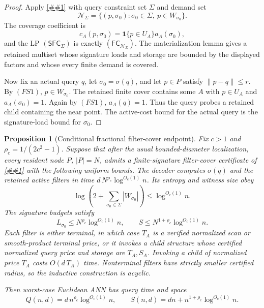 \documentclass[10pt]{article}
\newcommand{\cref}[1]{\ref{##1}}
\newtheorem{proposition}[theorem]{Proposition}
\theoremstyle{definition}
\begin{document}
\begin{proof}
   Apply \cref{lem:poisson-filter-cover-materialization} with query constraint
   set \(\Sigma\) and demand set
   \[
      \mathcal N_\Sigma
      =
      \{(p,\sigma_0):\sigma_0\in\Sigma,\ p\in W_{\sigma_0}\}.
   \]
   The coverage coefficient is
   \[
      c_A(p,\sigma_0)=\mathbf 1\{p\in U_A\}a_A(\sigma_0),
   \]
   and the LP \((\mathsf{SFC}_\Sigma)\) is exactly
   \((\mathsf{FC}_{\mathcal N_\Sigma})\).  The materialization lemma gives a
   retained multiset whose signature loads and storage are bounded by the
   displayed factors and whose every finite demand is covered.

   Now fix an actual query \(q\), let \(\sigma_0=\sigma(q)\), and let
   \(p\in P\) satisfy \(\|p-q\|\le r\).  By \((FS1)\), \(p\in W_{\sigma_0}\).
   The retained finite cover contains some \(A\) with \(p\in U_A\) and
   \(a_A(\sigma_0)=1\).  Again by \((FS1)\), \(a_A(q)=1\).  Thus the query probes
   a retained child containing the near point.  The active-cost bound for the
   actual query is the signature-load bound for \(\sigma_0\).
\end{proof}

\begin{proposition}[Conditional fractional filter-cover endpoint]
   \label{prop:fractional-filter-cover-polylog}
   Fix \(c>1\) and \(\rho_c=1/(2c^2-1)\).  Suppose that after the usual
   bounded-diameter localization, every resident node \(P\), \(|P|=N\), admits a
   finite-signature filter-cover certificate of
   \cref{lem:finite-signature-filter-cover} with the following uniform bounds.
   The decoder computes \(\sigma(q)\) and the retained active filters in time
   \(d\,N^{\rho_c}\log^{O_c(1)}n\).  Its entropy and witness size obey
   \[
      \log\left(2+\sum_{\sigma_0\in\Sigma}|W_{\sigma_0}|\right)
      \le \log^{O_c(1)}n.
      \tag{FE1}
   \]
   The signature budgets satisfy
   \[
      L_{\sigma_0}\le N^{\rho_c}\log^{O_c(1)}n,
      \qquad
      S\le N^{1+\rho_c}\log^{O_c(1)}n.
      \tag{FE2}
   \]
   Each filter is either terminal, in which case \(T_A\) is a verified normalized
   scan or smooth-product terminal price, or it invokes a child structure whose
   certified normalized query price and storage are \(T_A,S_A\).  Invoking a
   child of normalized price \(T_A\) costs \(O(d\,T_A)\) time.  Nonterminal
   filters have strictly smaller certified radius, so the inductive construction
   is acyclic.

   Then worst-case Euclidean ANN has query time and space
   \[
      Q(n,d)=d\,n^{\rho_c}\log^{O_c(1)}n,
      \qquad
      S(n,d)=dn+n^{1+\rho_c}\log^{O_c(1)}n .
   \]
\end{proposition}
\end{document}
